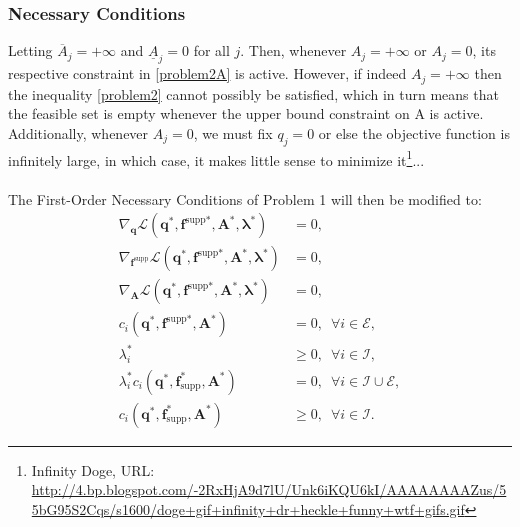 \documentclass[10pt,a4paper]{article}
\begin{document}
\subsubsection{Necessary Conditions}
Letting $\overline{A}_j = +\infty$ and $\underline{A}_j = 0$ for all $j$. Then, whenever $A_j = +\infty$ or $A_j = 0$, its respective constraint in \eqref{problem2A} is active. However, if indeed $A_j = +\infty$ then the inequality \eqref{problem2} cannot possibly be satisfied, which in turn means that the feasible set is empty whenever the upper bound constraint on A is active. Additionally, whenever $A_j = 0$, we must fix $q_j = 0$ or else the objective function is infinitely large, in which case, it makes little sense to minimize it\footnote{Infinity Doge, URL: \url{http://4.bp.blogspot.com/-2RxHjA9d7lU/Unk6iKQU6kI/AAAAAAAAZus/55bG95S2Cqs/s1600/doge+gif+infinity+dr+heckle+funny+wtf+gifs.gif}}...
\\\\
The First-Order Necessary Conditions of Problem 1 will then be modified to:
\begin{align}
\nabla_{\boldsymbol{q}}\mathcal{L}\left(\boldsymbol{q}^*,\boldsymbol{f}^\text{supp*},\boldsymbol{A}^*,\boldsymbol{\lambda}^*\right) &= 0, \\
\nabla_{\boldsymbol{f}^\text{supp}}\mathcal{L}\left(\boldsymbol{q}^*,\boldsymbol{f}^\text{supp*},\boldsymbol{A}^*,\boldsymbol{\lambda}^*\right) &= 0,\\
\nabla_{\boldsymbol{A}}\mathcal{L}\left(\boldsymbol{q}^*,\boldsymbol{f}^\text{supp*},\boldsymbol{A}^*,\boldsymbol{\lambda}^*\right) &= 0, \\
c_i\left(\boldsymbol{q}^*,\boldsymbol{f}^\text{supp*},\boldsymbol{A}^*\right) &= 0, \enspace \forall i \in \mathcal{E},\\
\lambda_i^* &\geq 0, \enspace \forall i\in\mathcal{I},\\
\lambda_i^* c_i(\boldsymbol{q}^*,\boldsymbol{f}_\text{supp}^*,\boldsymbol{A}^*) &= 0, \enspace \forall i\in\mathcal{I}\cup\mathcal{E},\\
c_i(\boldsymbol{q}^*,\boldsymbol{f}_\text{supp}^*,\boldsymbol{A}^*) &\geq 0, \enspace \forall i\in\mathcal{I}.
\end{align}
\end{document}
